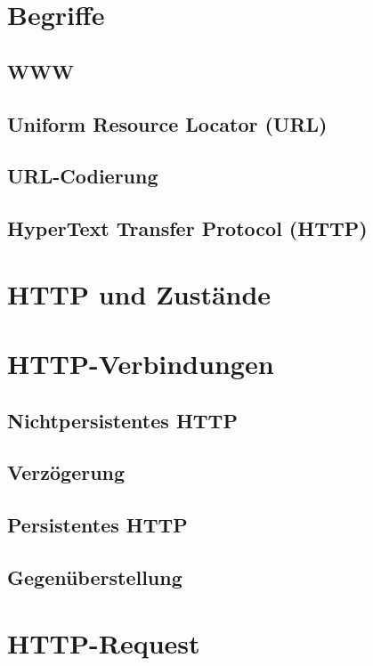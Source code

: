 \section{Begriffe}
\subsection{WWW}
\subsection{Uniform Resource Locator (URL)}
\subsection{URL-Codierung}
\subsection{HyperText Transfer Protocol (HTTP)}
\section{HTTP und Zustände}
\section{HTTP-Verbindungen}
\subsection{Nichtpersistentes HTTP}
\subsection*{Verzögerung}
\subsection{Persistentes HTTP}
\subsection{Gegenüberstellung}
\section{HTTP-Request}
